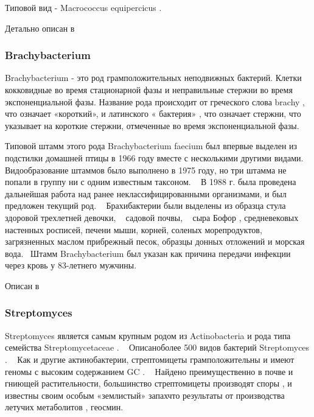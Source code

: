 \documentclass[11pt]{article}
\begin{document}
	Типовой вид - Macrococcus equipercicus .  ~\cite{Macrococcus_2,Macrococcus_3}
	
	Детально описан в ~\cite{Macrococcus_1,Macrococcus_2,Macrococcus_3,Macrococcus_4,Macrococcus_5,Macrococcus_6}
	
	\subsubsection{Brachybacterium}
	Brachybacterium - это род грамположительных неподвижных бактерий. Клетки кокковидные во время стационарной фазы и неправильные стержни во время экспоненциальной фазы. Название рода происходит от греческого слова brachy , что означает «короткий», и латинского « бактерия» , что означает стержни, что указывает на короткие стержни, отмеченные во время экспоненциальной фазы. ~\cite{Brachybacterium_6}
	
	Типовой штамм этого рода Brachybacterium faecium был впервые выделен из подстилки домашней птицы в 1966 году вместе с несколькими другими видами. ~\cite{Brachybacterium_7} Видообразование штаммов было выполнено в 1975 году, но три штамма не попали в группу ни с одним известным таксоном. ~\cite{Brachybacterium_8} В 1988 г. была проведена дальнейшая работа над ранее неклассифицированными организмами, и был предложен текущий род. ~\cite{Brachybacterium_6} Брахибактерии были выделены из образца стула здоровой трехлетней девочки, ~\cite{Brachybacterium_4} садовой почвы, ~\cite{Brachybacterium_3} сыра Бофор , средневековых настенных росписей, печени мыши, корней, соленых морепродуктов, загрязненных маслом прибрежный песок, образцы донных отложений и морская вода.~\cite{Brachybacterium_5, Brachybacterium_9} Штамм Brachybacterium был указан как причина передачи инфекции через кровь у 83-летнего мужчины. ~\cite{Brachybacterium_10}
	
	Описан в  ~\cite{Brachybacterium_1, Brachybacterium_2,Brachybacterium_3,Brachybacterium_4,Brachybacterium_5,Brachybacterium_6,Brachybacterium_7,Brachybacterium_8,Brachybacterium_9, Brachybacterium_10}
	
	\subsubsection{Streptomyces}
	Streptomyces является самым крупным родом из Actinobacteria и рода типа семейства Streptomycetaceae . ~\cite{Streptomyces_2} Описаноболее 500 видов бактерий Streptomyces . ~\cite{Streptomyces_3} Как и другие актинобактерии, стрептомицеты грамположительны и имеют геномы с высоким содержанием GC . ~\cite{Streptomyces_4} Найдено преимущественно в почве и гниющей растительности, большинство стрептомицеты производят споры , и известны своим особым «землистый» запахчто результаты от производства летучих метаболитов , геосмин.
	
\end{document}
